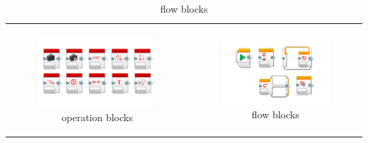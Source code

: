 \documentclass[11 pt,t]{beamer}
\begin{document}
\begin{frame}
\begin{table}[h!]
\begin{center}
\begin{tabular}{cc}
      \begin{subfigure}{0.5\textwidth}\centering\caption{operation blocks}\includegraphics[width=\textwidth]{../images/LearnToProgram_operations_blocks_landscape.png}\end{subfigure}&
      \begin{subfigure}{0.5\textwidth}\centering\caption{flow blocks}\includegraphics[width=\textwidth]{../images/LearnToProgram_flow_blocks_landscape.png}\end{subfigure}\\
      \end{tabular}
      \end{center}
    \end{table}
\end{frame}
\end{document}
